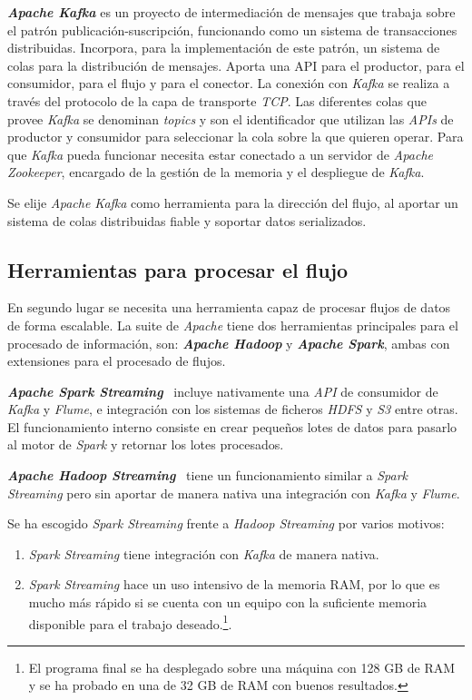 \textit{\textbf{Apache Kafka}} es un proyecto de intermediación de mensajes que trabaja sobre el patrón publicación-suscripción, funcionando como un sistema de transacciones distribuidas. Incorpora, para la implementación de este patrón, un sistema de colas para la distribución de mensajes. Aporta una API para el productor, para el consumidor, para el flujo y para el conector. La conexión con \textit{Kafka} se realiza a través del protocolo de la capa de transporte \textit{TCP}. Las diferentes colas que provee \textit{Kafka} se denominan \textit{topics} y son el identificador que utilizan las \textit{APIs} de productor y consumidor para seleccionar la cola sobre la que quieren operar. Para que \textit{Kafka} pueda funcionar necesita estar conectado a un servidor de \textit{Apache Zookeeper}, encargado de la gestión de la memoria y el despliegue de \textit{Kafka}.

Se elije \textit{Apache Kafka} como herramienta para la dirección del flujo, al aportar un sistema de colas distribuidas fiable y soportar datos serializados.

\subsection{Herramientas para procesar el flujo}
En segundo lugar se necesita una herramienta capaz de procesar flujos de datos de forma escalable. La suite de \textit{Apache} tiene dos herramientas principales para el procesado de información, son: \textit{\textbf{Apache Hadoop}} y \textit{\textbf{Apache Spark}}, ambas con extensiones para el procesado de flujos.

\textit{\textbf{Apache Spark Streaming}}~\cite{noauthorsparknodate} incluye nativamente una \textit{API} de consumidor de \textit{Kafka} y \textit{Flume}, e integración con los sistemas de ficheros \textit{HDFS} y \textit{S3} entre otras. El funcionamiento interno consiste en crear pequeños lotes de datos para pasarlo al motor de \textit{Spark} y retornar los lotes procesados.

\textit{\textbf{Apache Hadoop Streaming}}~\cite{noauthorhadoop} tiene un funcionamiento similar a \textit{Spark Streaming} pero sin aportar de manera nativa una integración con \textit{Kafka} y \textit{Flume}.

Se ha escogido \textit{Spark Streaming} frente a \textit{Hadoop Streaming} por varios motivos:
\begin{enumerate}
	\item \textit{Spark Streaming} tiene integración con \textit{Kafka} de manera nativa.
	\item \textit{Spark Streaming} hace un uso intensivo de la memoria RAM, por lo que es mucho más rápido si se cuenta con un equipo con la suficiente memoria disponible para el trabajo deseado.\footnote{El programa final se ha desplegado sobre una máquina con 128 GB de RAM y se ha probado en una de 32 GB de RAM con buenos resultados.}.
\end{enumerate}



